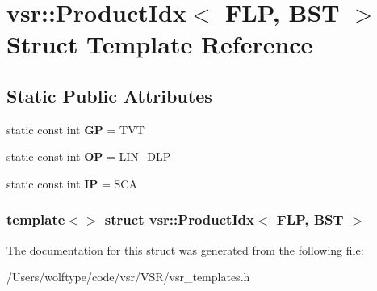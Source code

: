 \hypertarget{structvsr_1_1_product_idx_3_01_f_l_p_00_01_b_s_t_01_4}{\section{vsr\-:\-:Product\-Idx$<$ F\-L\-P, B\-S\-T $>$ Struct Template Reference}
\label{structvsr_1_1_product_idx_3_01_f_l_p_00_01_b_s_t_01_4}
}
\subsection*{Static Public Attributes}
\begin{DoxyCompactItemize}
\item 
\hypertarget{structvsr_1_1_product_idx_3_01_f_l_p_00_01_b_s_t_01_4_ac290dfb13758ec4edcab7c9ab4a82385}{static const int {\bfseries G\-P} = T\-V\-T}\label{structvsr_1_1_product_idx_3_01_f_l_p_00_01_b_s_t_01_4_ac290dfb13758ec4edcab7c9ab4a82385}

\item 
\hypertarget{structvsr_1_1_product_idx_3_01_f_l_p_00_01_b_s_t_01_4_a0ad85bf4e5526ed1171a4dad366a8d97}{static const int {\bfseries O\-P} = L\-I\-N\-\_\-\-D\-L\-P}\label{structvsr_1_1_product_idx_3_01_f_l_p_00_01_b_s_t_01_4_a0ad85bf4e5526ed1171a4dad366a8d97}

\item 
\hypertarget{structvsr_1_1_product_idx_3_01_f_l_p_00_01_b_s_t_01_4_acfa96de49b2e32b3a822a5cc74567117}{static const int {\bfseries I\-P} = S\-C\-A}\label{structvsr_1_1_product_idx_3_01_f_l_p_00_01_b_s_t_01_4_acfa96de49b2e32b3a822a5cc74567117}

\end{DoxyCompactItemize}
\subsubsection*{template$<$$>$ struct vsr\-::\-Product\-Idx$<$ F\-L\-P, B\-S\-T $>$}



The documentation for this struct was generated from the following file\-:\begin{DoxyCompactItemize}
\item 
/\-Users/wolftype/code/vsr/\-V\-S\-R/vsr\-\_\-templates.\-h\end{DoxyCompactItemize}
